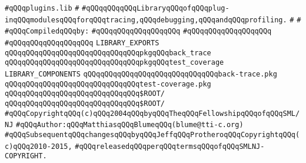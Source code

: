 \label{src/app/debug/plugins.lib}
\verb|#qQQqplugins.lib|\newline
\verb|#|\newline
\verb|#qQQqqQQqqQQqLibraryqQQqofqQQqplug-inqQQqmodulesqQQqforqQQqtracing,qQQqdebugging,qQQqandqQQqprofiling.|\newline
\verb|#|\newline
\verb|#|\newline
\newline
\verb|#qQQqCompiledqQQqby:|\newline
\verb|#qQQqqQQqqQQqqQQqqQQq|\newline
\verb|#qQQqqQQqqQQqqQQqqQQq|\newline
\verb|#qQQqqQQqqQQqqQQqqQQq|\newline
\newline
\verb|LIBRARY_EXPORTS|\newline
\newline
\verb|qQQqqQQqqQQqqQQqqQQqqQQqqQQqqQQqpkgqQQqback_trace|\newline
\verb|qQQqqQQqqQQqqQQqqQQqqQQqqQQqqQQqpkgqQQqtest_coverage|\newline
\newline
\newline
\newline
\verb|LIBRARY_COMPONENTS|\newline
\newline
\verb|qQQqqQQqqQQqqQQqqQQqqQQqqQQqqQQqback-trace.pkg|\newline
\verb|qQQqqQQqqQQqqQQqqQQqqQQqqQQqqQQqtest-coverage.pkg|\newline
\newline
\verb|qQQqqQQqqQQqqQQqqQQqqQQqqQQqqQQq$ROOT/|\newline
\newline
\verb|qQQqqQQqqQQqqQQqqQQqqQQqqQQqqQQq$ROOT/|\newline
\newline
\newline
\verb|#qQQqCopyrightqQQq(c)qQQq2004qQQqbyqQQqTheqQQqFellowshipqQQqofqQQqSML/NJ|\newline
\verb|#qQQqAuthor:qQQqMatthiasqQQqBlumeqQQq(blume@tti-c.org)|\newline
\verb|#qQQqSubsequentqQQqchangesqQQqbyqQQqJeffqQQqProtheroqQQqCopyrightqQQq(c)qQQq2010-2015,|\newline
\verb|#qQQqreleasedqQQqperqQQqtermsqQQqofqQQqSMLNJ-COPYRIGHT.|\newline

